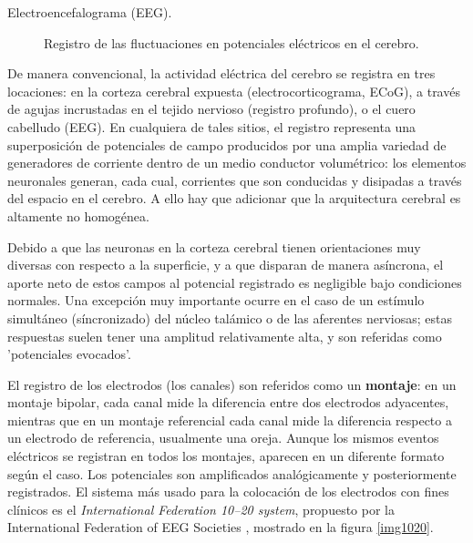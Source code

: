 \documentclass[12pt,a4paper]{mitthesis}
\begin{document}
\begin{description}
\item[Electroencefalograma (EEG).] Registro de las fluctuaciones en potenciales el\'ectricos en el 
cerebro.
\end{description}

De manera convencional, la actividad el\'ectrica del cerebro se registra en tres locaciones: en la 
corteza cerebral expuesta (electrocorticograma, ECoG), a trav\'es de agujas incrustadas en el 
tejido nervioso (registro profundo), o el cuero cabelludo (EEG).
En cualquiera de tales sitios, el registro representa una superposici\'on de potenciales de campo 
producidos por una amplia variedad de generadores de corriente dentro de un medio conductor 
volum\'etrico: los elementos neuronales generan, cada cual, corrientes que son conducidas y 
disipadas a trav\'es del espacio en el cerebro.
A ello hay que adicionar que la arquitectura cerebral es altamente no homog\'enea.

Debido a que las neuronas en la corteza cerebral tienen orientaciones muy diversas con respecto a 
la superficie, y a que disparan de manera as\'incrona, el aporte neto de estos campos al potencial 
registrado es negligible bajo condiciones normales.
Una excepci\'on muy importante ocurre en el caso de un est\'imulo simult\'aneo (s\'incronizado)
del n\'ucleo tal\'amico o de las aferentes nerviosas; estas respuestas suelen tener una amplitud 
relativamente alta, y son referidas como 'potenciales evocados'.

El registro de los electrodos (los canales) son referidos como un \textbf{montaje}: en un montaje 
bipolar, cada canal mide la diferencia entre dos electrodos adyacentes, mientras que en un montaje 
referencial cada canal mide la diferencia respecto a un electrodo de referencia, usualmente una 
oreja.
Aunque los mismos eventos el\'ectricos se registran en todos los montajes, aparecen en un diferente 
formato seg\'un el caso. 
Los potenciales son amplificados anal\'ogicamente y posteriormente registrados.
El sistema m\'as usado para la colocaci\'on de los electrodos con fines cl\'inicos es el 
\textit{International Federation 10--20 system}, propuesto por la International Federation of EEG 
Societies \cite{Jasper58,AASM07}, mostrado en la figura \ref{img1020}. 
\end{document}
